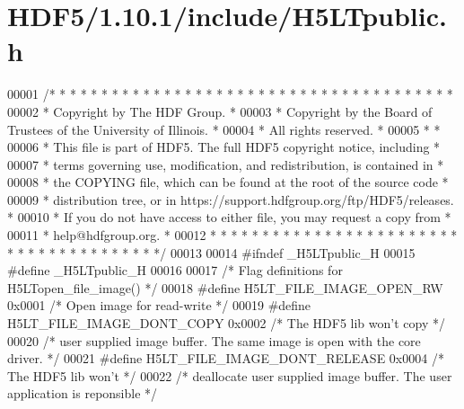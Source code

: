 \hypertarget{_h_d_f5_21_810_81_2include_2_h5_l_tpublic_8h_source}{}\section{H\+D\+F5/1.10.1/include/\+H5\+L\+Tpublic.h}
\label{_h_d_f5_21_810_81_2include_2_h5_l_tpublic_8h_source}

\begin{DoxyCode}
00001 \textcolor{comment}{/* * * * * * * * * * * * * * * * * * * * * * * * * * * * * * * * * * * * * * *}
00002 \textcolor{comment}{ * Copyright by The HDF Group.                                               *}
00003 \textcolor{comment}{ * Copyright by the Board of Trustees of the University of Illinois.         *}
00004 \textcolor{comment}{ * All rights reserved.                                                      *}
00005 \textcolor{comment}{ *                                                                           *}
00006 \textcolor{comment}{ * This file is part of HDF5.  The full HDF5 copyright notice, including     *}
00007 \textcolor{comment}{ * terms governing use, modification, and redistribution, is contained in    *}
00008 \textcolor{comment}{ * the COPYING file, which can be found at the root of the source code       *}
00009 \textcolor{comment}{ * distribution tree, or in https://support.hdfgroup.org/ftp/HDF5/releases.  *}
00010 \textcolor{comment}{ * If you do not have access to either file, you may request a copy from     *}
00011 \textcolor{comment}{ * help@hdfgroup.org.                                                        *}
00012 \textcolor{comment}{ * * * * * * * * * * * * * * * * * * * * * * * * * * * * * * * * * * * * * * */}
00013 
00014 \textcolor{preprocessor}{#ifndef \_H5LTpublic\_H}
00015 \textcolor{preprocessor}{#define \_H5LTpublic\_H}
00016 
00017 \textcolor{comment}{/* Flag definitions for H5LTopen\_file\_image() */}
00018 \textcolor{preprocessor}{#define H5LT\_FILE\_IMAGE\_OPEN\_RW      0x0001 }\textcolor{comment}{/* Open image for read-write */}\textcolor{preprocessor}{}
00019 \textcolor{preprocessor}{#define H5LT\_FILE\_IMAGE\_DONT\_COPY    0x0002 }\textcolor{comment}{/* The HDF5 lib won't copy   */}\textcolor{preprocessor}{}
00020 \textcolor{comment}{/* user supplied image buffer. The same image is open with the core driver.  */}
00021 \textcolor{preprocessor}{#define H5LT\_FILE\_IMAGE\_DONT\_RELEASE 0x0004 }\textcolor{comment}{/* The HDF5 lib won't        */}\textcolor{preprocessor}{}
00022 \textcolor{comment}{/* deallocate user supplied image buffer. The user application is reponsible */}

\end{DoxyCode}
